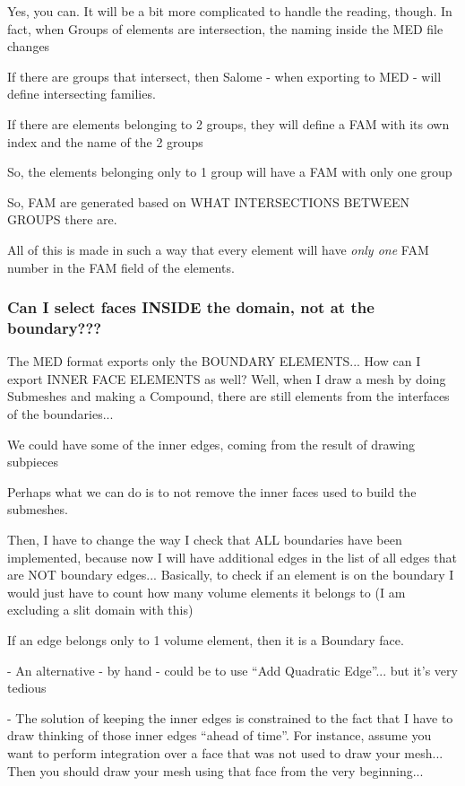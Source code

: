 \documentclass[10pt]{book}
\begin{document}
 Yes, you can. It will be a bit more complicated to handle the reading, though.
 In fact, when Groups of elements are intersection,
 the naming inside the MED file changes
 
 If there are groups that intersect, then Salome - when exporting to MED - 
 will define intersecting families. 
 
 If there are elements belonging to 2 groups,
 they will define a FAM with its own index and the name of the 2 groups
 
 So, the elements belonging only to 1 group will have a FAM with only one group
 
 So, FAM are generated based on WHAT INTERSECTIONS BETWEEN GROUPS there are.
 
 All of this is made in such a way that every element 
 will have \textit{only one} FAM number in the FAM field of the elements.
 

\subsubsection{Can I select faces INSIDE the domain, not at the boundary???}

 The MED format exports only the BOUNDARY ELEMENTS...
 How can I export INNER FACE ELEMENTS as well?
 Well, when I draw a mesh by doing Submeshes and making a Compound,
 there are still elements from the interfaces of the boundaries...
 
 We could have some of the inner edges, coming from the result of drawing subpieces 

 Perhaps what we can do is to not remove the inner faces used to build the submeshes.
 
 Then, I have to change the way I check that ALL boundaries have been implemented,
 because now I will have additional edges in the list of all edges
 that are NOT boundary edges...
 Basically, to check if an element is on the boundary I would 
 just have to count how many volume elements it belongs to
 (I am excluding a slit domain with this)
 
 If an edge belongs only to 1 volume element, then it is a Boundary face.
 
 
 - An alternative - by hand - could be to use ``Add Quadratic Edge''... but it's very tedious
 
 - The solution of keeping the inner edges is constrained to the fact 
   that I have to draw thinking of those inner edges ``ahead of time''.
   For instance, assume you want to perform integration over a face 
   that was not used to draw your mesh... 
   Then you should draw your mesh using that face from the very beginning...
   
\end{document}
